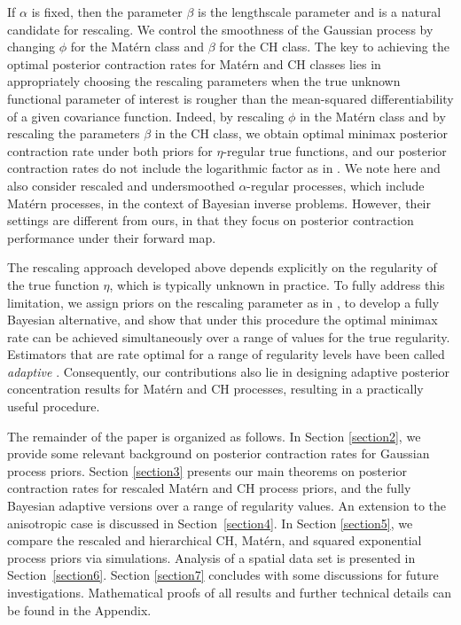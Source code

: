 \documentclass[ejs,noshowframe]{imsart}
\theoremstyle{plain}
\theoremstyle{definition}
\theoremstyle{remark}
\begin{document}
If $\alpha$ is fixed, then the parameter $\beta$ is the lengthscale parameter and is a natural candidate for rescaling.  We control the smoothness of the Gaussian process by changing $\phi$  for the Mat\'ern class  and $\beta$ for the CH class. The key to achieving  the  optimal posterior contraction rates for Mat\'ern and CH  classes lies in  appropriately choosing the rescaling parameters when the true unknown functional parameter of interest is rougher than the mean-squared differentiability of a given covariance function. Indeed, by rescaling $\phi$ in the Mat\'ern class and by rescaling the parameters $\beta$ in the CH class, we obtain optimal minimax  posterior contraction  rate under both priors  for $\eta$-regular true functions, and our posterior contraction rates do not include the logarithmic factor as in \cite{van2007bayesian}.  We note here  \cite{giordano2020consistency} and \cite{nickl2023bayesian} also consider rescaled and undersmoothed $\alpha$-regular processes, which include Mat\'ern processes,  in the context of Bayesian inverse problems. However,  their settings are different from ours, in that they focus on posterior contraction performance  under  their forward map.  

The rescaling approach developed above depends explicitly on the
regularity of the true function $\eta$, which is  typically unknown in practice. To fully address this limitation, we assign  priors on the rescaling parameter  as in \cite{van2009adaptive}, to develop a fully Bayesian alternative,  and show that under this procedure the optimal minimax rate can be achieved simultaneously over a range of values for the true regularity.  Estimators that are rate optimal for a range of regularity levels have been called  \textit{adaptive} \citep{efroimovich1984learning,lepskii1991problem,lepskii1992asymptotically}.  Consequently, our contributions also lie in designing adaptive posterior concentration results for Mat\'ern and CH processes, resulting in a practically useful procedure.



The  remainder of the paper is organized as follows. In Section \ref{section2}, we provide some  relevant background on posterior contraction rates for Gaussian process priors.  Section \ref{section3} presents our main theorems on  posterior contraction rates for  rescaled Mat\'ern  and CH process priors, and the fully Bayesian adaptive versions over a range of regularity values. An extension to the anisotropic  case is discussed in Section~\ref{section4}. In Section \ref{section5}, we  compare the rescaled and hierarchical CH, Mat\'ern, and squared exponential process priors via simulations.  Analysis of a spatial data set is presented in Section~\ref{section6}.  Section \ref{section7} concludes with some discussions for future investigations. Mathematical proofs of all results and further technical details can be found in the Appendix.
\end{document}
